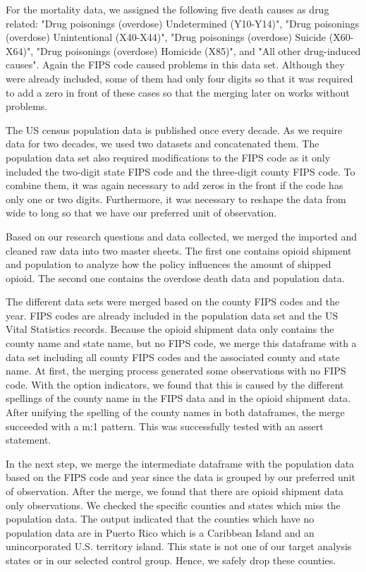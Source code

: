 \documentclass[12pt,letterpaper]{article}
\begin{document}
For the mortality data, we assigned the following five death causes as drug related: "Drug poisonings (overdose) Undetermined (Y10-Y14)", "Drug poisonings (overdose) Unintentional (X40-X44)", "Drug poisonings (overdose) Suicide (X60-X64)", "Drug poisonings (overdose) Homicide (X85)", and "All other drug-induced causes". Again the FIPS code caused problems in this data set. Although they were already included, some of them had only four digits so that it was required to add a zero in front of these cases so that the merging later on works without problems.

The US census population data is published once every decade. As we require data for two decades, we used two datasets and concatenated them. The population data set also required modifications to the FIPS code as it only included the two-digit state FIPS code and the three-digit county FIPS code. To combine them, it was again necessary to add zeros in the front if the code has only one or two digits. Furthermore, it was necessary to reshape the data from wide to long so that we have our preferred unit of observation.

Based on our research questions and data collected, we merged the imported and cleaned raw data into two master sheets. The first one contains opioid shipment and population to analyze how the policy influences the amount of shipped opioid. The second one contains the overdose death data and population data. 

The different data sets were merged based on the county FIPS codes and the year. FIPS codes are already included in the population data set and the US Vital Statistics records. Because the opioid shipment data only contains the county name and state name, but no FIPS code, we merge this dataframe with a data set including all county FIPS codes and the associated county and state name. At first, the merging process generated some observations with no FIPS code. With the option indicators, we found that this is caused by the different spellings of the county name in the FIPS data and in the opioid shipment data. After unifying the spelling of the county names in both dataframes, the merge succeeded with a m:1 pattern. This was successfully tested with an assert statement.

In the next step, we merge the intermediate dataframe with the population data based on the FIPS code and year since the data is grouped by our preferred unit of observation. After the merge, we found that there are opioid shipment data only observations. We checked the specific counties and states which miss the population data. The output indicated that the counties which have no population data are in Puerto Rico which is a Caribbean Island and an unincorporated U.S. territory island. This state is not one of our target analysis states or in our selected control group. Hence, we safely drop these counties.
\end{document}
